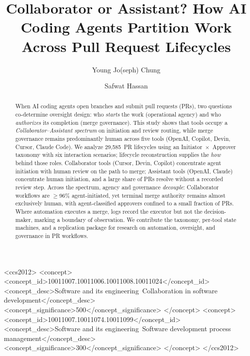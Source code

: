 \documentclass[sigconf]{acmart}
\begin{document}
\title{Collaborator or Assistant? How AI Coding Agents Partition Work Across Pull Request Lifecycles}
\author{Young Jo(seph) Chung}

\author{Safwat Hassan}
\renewcommand{\shortauthors}{Chung and Hassan}
\begin{abstract}
When AI coding agents open branches and submit pull requests (PRs),
two questions co-determine oversight design: who \emph{starts} the
work (operational agency) and who \emph{authorizes} its completion
(merge governance).
This study shows that tools occupy a \emph{Collaborator--Assistant
spectrum} on initiation and review routing, while merge governance
remains predominantly human across five tools (OpenAI, Copilot,
Devin, Cursor, Claude Code).
We analyze 29,585~PR lifecycles using an Initiator~$\times$~Approver
taxonomy with six interaction scenarios; lifecycle reconstruction
supplies the \emph{how} behind those roles.
Collaborator tools (Cursor, Devin, Copilot) concentrate agent
initiation with human review on the path to merge; Assistant tools
(OpenAI, Claude) concentrate human initiation, and a large share of
PRs resolve without a recorded review step.
Across the spectrum, agency and governance \emph{decouple}:
Collaborator workflows are $\geq$96\% agent-initiated, yet terminal
merge authority remains almost exclusively human, with
agent-classified approvers confined to a small fraction of PRs.
Where automation executes a merge, logs record the executor but not
the decision-maker, marking a boundary of observation.
We contribute the taxonomy, per\nobreakdash-tool state machines, and a
replication package for research on automation, oversight, and
governance in PR workflows.
\end{abstract}

\begin{CCSXML}
<ccs2012>
   <concept>
       <concept_id>10011007.10011006.10011008.10011024</concept_id>
       <concept_desc>Software and its engineering~Collaboration in software development</concept_desc>
       <concept_significance>500</concept_significance>
   </concept>
   <concept>
       <concept_id>10011007.10011074.10011099</concept_id>
       <concept_desc>Software and its engineering~Software development process management</concept_desc>
       <concept_significance>300</concept_significance>
   </concept>
</ccs2012>
\end{CCSXML}
\end{document}
